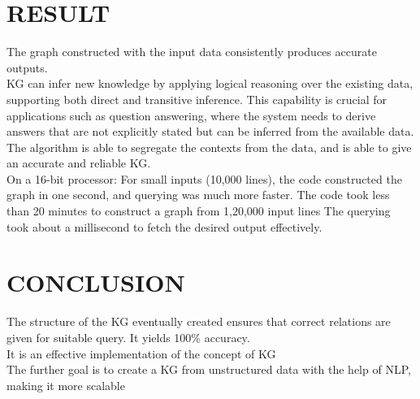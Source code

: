 \documentclass[conference]{IEEEtran}
\begin{document}
\section{RESULT}
The graph constructed with the input data consistently produces accurate outputs.
\\
KG can infer new knowledge by applying logical reasoning over the existing data, supporting both direct and transitive inference. This capability is crucial for applications such as question answering, where the system needs to derive answers that are not explicitly stated but can be inferred from the available data.
\\
The algorithm is able to segregate the contexts from the data, and is able to give an accurate and reliable KG.
\\
On a 16-bit processor:
For small inputs (10,000 lines), the code constructed the graph in one second, and querying was much more faster.
The code took less than 20 minutes to construct a graph from 1,20,000 input lines 
The querying took about a millisecond to fetch the desired output effectively.

\section{CONCLUSION}
The structure of the KG eventually created ensures that correct relations are given for suitable query. It yields 100\% accuracy.
\\
It is an effective implementation of the concept of KG
\\
The further goal is to create a KG from unstructured data with the help of NLP, making it more scalable
\end{document}
